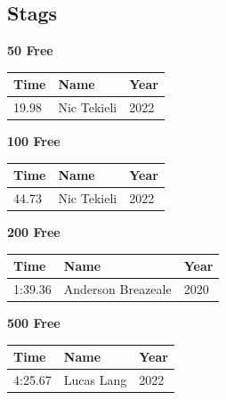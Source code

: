 \subsection{Stags}
\vspace{1.2em}
\noindent\begin{minipage}[t]{0.48\textwidth}
\centering
\textbf{\textcolor{teamprimary}{50 Free}}\par
\vspace{0.5em}
\centering
\small
\renewcommand{\arraystretch}{1.0}
\setlength{\tabcolsep}{4pt}
\begin{tabular}{@{}p{1.8cm}p{3.0cm}p{1.0cm}@{}}
\toprule
\textbf{Time} & \textbf{Name} & \textbf{Year} \\
\midrule
19.98 & Nic Tekieli & 2022 \\
\bottomrule
\end{tabular}
\end{minipage}
\hfill
\begin{minipage}[t]{0.48\textwidth}
\centering
\textbf{\textcolor{teamprimary}{100 Free}}\par
\vspace{0.5em}
\centering
\small
\renewcommand{\arraystretch}{1.0}
\setlength{\tabcolsep}{4pt}
\begin{tabular}{@{}p{1.8cm}p{3.0cm}p{1.0cm}@{}}
\toprule
\textbf{Time} & \textbf{Name} & \textbf{Year} \\
\midrule
44.73 & Nic Tekieli & 2022 \\
\bottomrule
\end{tabular}
\end{minipage}
\vspace{0.3em}
\vspace{1.2em}
\noindent\begin{minipage}[t]{0.48\textwidth}
\centering
\textbf{\textcolor{teamprimary}{200 Free}}\par
\vspace{0.5em}
\centering
\small
\renewcommand{\arraystretch}{1.0}
\setlength{\tabcolsep}{4pt}
\begin{tabular}{@{}p{1.8cm}p{3.0cm}p{1.0cm}@{}}
\toprule
\textbf{Time} & \textbf{Name} & \textbf{Year} \\
\midrule
1:39.36 & Anderson Breazeale & 2020 \\
\bottomrule
\end{tabular}
\end{minipage}
\hfill
\begin{minipage}[t]{0.48\textwidth}
\centering
\textbf{\textcolor{teamprimary}{500 Free}}\par
\vspace{0.5em}
\centering
\small
\renewcommand{\arraystretch}{1.0}
\setlength{\tabcolsep}{4pt}
\begin{tabular}{@{}p{1.8cm}p{3.0cm}p{1.0cm}@{}}
\toprule
\textbf{Time} & \textbf{Name} & \textbf{Year} \\
\midrule
4:25.67 & Lucas Lang & 2022 \\
\bottomrule
\end{tabular}
\end{minipage}
